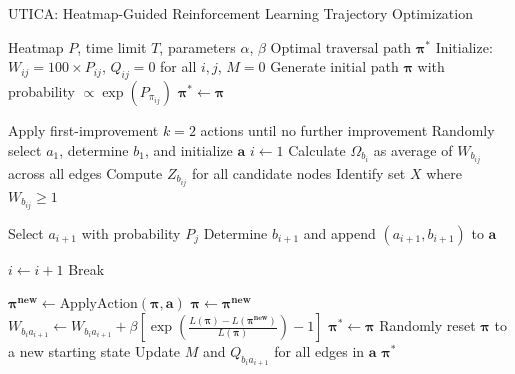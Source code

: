 \documentclass[sigconf]{acmart}
\begin{document}
\begin{algorithm}
\caption{UTICA: Heatmap-Guided Reinforcement Learning Trajectory Optimization}
\begin{algorithmic}[1]
\Require Heatmap $P$, time limit $T$, parameters $\alpha$, $\beta$
\Ensure Optimal traversal path $\boldsymbol{\pi^*}$
\State Initialize: $W_{ij} = 100 \times P_{ij}$, $Q_{ij} = 0$ for all $i,j$, $M = 0$
\State Generate initial path $\boldsymbol{\pi}$ with probability $\propto \exp(P_{\pi_{i j}})$
\State $\boldsymbol{\pi^*} \gets \boldsymbol{\pi}$

    \State Apply first-improvement $k=2$ actions until no further improvement
        \State Randomly select $a_1$, determine $b_1$, and initialize $\boldsymbol{a}$
        \State $i \gets 1$
            \State Calculate $\Omega_{b_i}$ as average of $W_{b_{i j}}$ across all edges 
            \State Compute $Z_{b_{i j}}$ for all candidate nodes
            \State Identify set $X$ where $W_{b_{i j}} \geq 1$ 

            \State Select $a_{i+1}$ with probability $P_j$
            \State Determine $b_{i+1}$ and append $(a_{i+1}, b_{i+1})$ to $\boldsymbol{a}$

            \State $i \gets i + 1$
                \State Break
            \EndIf
        \EndWhile
        
        \State $\boldsymbol{\pi^{new}} \gets \text{ApplyAction}(\boldsymbol{\pi}, \boldsymbol{a})$
            \State $\boldsymbol{\pi} \gets \boldsymbol{\pi^{new}}$
                \State $W_{b_i a_{i+1}} \gets W_{b_i a_{i+1}} + \beta[\exp(\frac{L(\boldsymbol{\pi}) - L(\boldsymbol{\pi^{new}})}{L(\boldsymbol{\pi})}) - 1]$
            \EndFor
                \State $\boldsymbol{\pi^*} \gets \boldsymbol{\pi}$
            \EndIf
        \Else
            \State Randomly reset $\boldsymbol{\pi}$ to a new starting state
        \EndIf
    \EndIf
    \State Update $M$ and $Q_{b_i a_{i+1}}$ for all edges in $\boldsymbol{a}$
\EndWhile
\State \Return $\boldsymbol{\pi^*}$
\end{algorithmic}
\end{algorithm}
\end{document}
